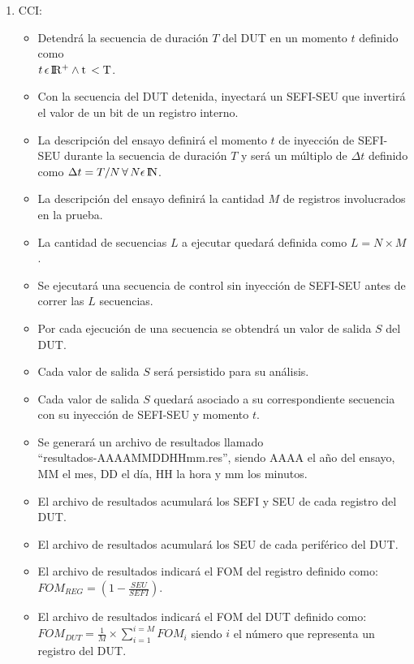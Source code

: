 \documentclass[
11pt, %
]{charter}
\begin{document}
\begin{enumerate}
	\item CCI:
	\begin{itemize}
		\item Detendrá la secuencia de duración $ T $ del DUT en un momento $ t $ definido como \\ $ t \, \epsilon \, \rm I\!R^+ \wedge t \, < T$.
		\item Con la secuencia del DUT detenida, inyectará un SEFI-SEU que invertirá el valor de un bit de un registro interno.
		\item La descripción del ensayo definirá el momento $ t $ de inyección de SEFI-SEU durante la secuencia de duración $ T $ y será un múltiplo de $\Delta t$ definido como $ \Delta t=T/N \, \forall \, N \epsilon \, \rm I\!N $.
		\item La descripción del ensayo definirá la cantidad $ M $ de registros involucrados en la prueba.
		\item La cantidad de secuencias $ L $ a ejecutar quedará definida como $ L = N \times M $.
		\item Se ejecutará una secuencia de control sin inyección de SEFI-SEU antes de correr las $ L $ secuencias.
		\item Por cada ejecución de una secuencia se obtendrá un valor de salida $ S $ del DUT.
		\item Cada valor de salida $ S $ será persistido para su análisis.
		\item Cada valor de salida $ S $ quedará asociado a su correspondiente secuencia con su inyección de SEFI-SEU y momento $ t $.
		\item Se generará un archivo de resultados llamado\\ ``resultados-AAAAMMDDHHmm.res'', siendo AAAA el año del ensayo, MM el mes, DD el día, HH la hora y mm los minutos.
		\item El archivo de resultados acumulará los SEFI y SEU de cada registro del DUT.
		\item El archivo de resultados acumulará los SEU de cada periférico del DUT.
		\item El archivo de resultados indicará el FOM del registro definido como: \\
		$ FOM_{REG} = (1 - \frac{SEU}{SEFI}) $.
		\item El archivo de resultados indicará el FOM del DUT definido como: \\
		$ FOM_{DUT} = \frac{1}{M} \times \sum_{i = 1}^{i = M}FOM_{i} $ siendo $ i $ el número que representa un registro del DUT.

\end{itemize}
\end{enumerate}
\end{document}
